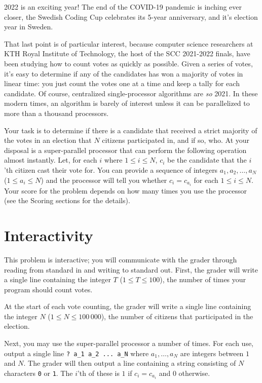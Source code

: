 2022 is an exciting year!
The end of the COVID-19 pandemic is inching ever closer, the Swedish Coding Cup celebrates its 5-year anniversary, and it's election year in Sweden.

That last point is of particular interest, because computer science researchers at KTH Royal Institute of Technology, the host of the SCC 2021-2022 finals, have been studying how to count votes as quickly as possible.
Given a series of votes, it's easy to determine if any of the candidates has won a majority of votes in linear time: you just count the votes one at a time and keep a tally for each candidate.
Of course, centralized single-processor algorithms are \emph{so} 2021.
In these modern times, an algorithm is barely of interest unless it can be parallelized to more than a thousand processors.

Your task is to determine if there is a candidate that received a strict majority of the votes in an election that $N$ citizens participated in, and if so, who.
At your disposal is a super-parallel processor that can perform the following operation almost instantly.
Let, for each $i$ where $1 \le i \le N$, $c_i$ be the candidate that the $i$'th citizen cast their vote for.
You can provide a sequence of integers $a_1, a_2, \dots, a_N$ ($1 \le a_i \le N$) and the processor will tell you whether $c_i = c_{a_i}$ for each $1 \le i \le N$.
Your score for the problem depends on how many times you use the processor (see the Scoring sections for the details).

\section*{Interactivity}
This problem is interactive; you will communicate with the grader through reading from standard in and writing to standard out.
First, the grader will write a single line containing the integer $T$ ($1 \le T \le 100$), the number of times your program should count votes.

At the start of each vote counting, the grader will write a single line containing the integer $N$ ($1 \le N \le 100\,000$), the number of citizens that participated in the election.

Next, you may use the super-parallel processor a number of times.
For each use, output a single line \texttt{? a\_1 a\_2 ... a\_N} where $a_1, \dots, a_N$ are integers between $1$ and $N$.
The grader will then output a line containing a string consisting of $N$ characters \texttt{0} or \texttt{1}.
The $i$'th of these is $1$ if $c_i = c_{a_i}$ and $0$ otherwise.

